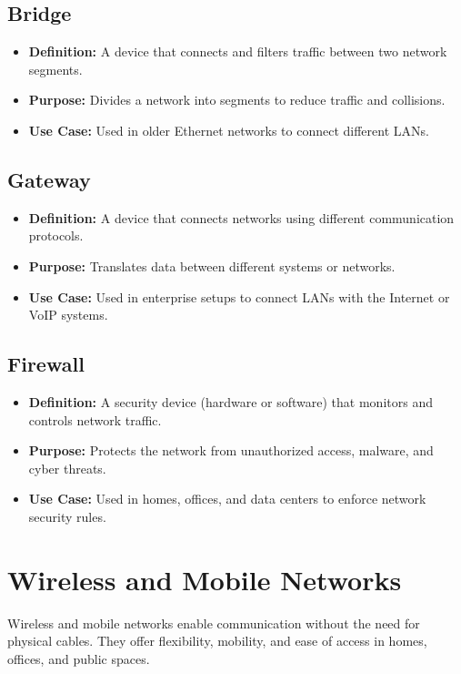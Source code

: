 \subsection{Bridge}
\begin{itemize}[leftmargin=1.5cm]
  \item \textbf{Definition:} A device that connects and filters traffic between two network segments.
  \item \textbf{Purpose:} Divides a network into segments to reduce traffic and collisions.
  \item \textbf{Use Case:} Used in older Ethernet networks to connect different LANs.
\end{itemize}

\subsection{Gateway}
\begin{itemize}[leftmargin=1.5cm]
  \item \textbf{Definition:} A device that connects networks using different communication protocols.
  \item \textbf{Purpose:} Translates data between different systems or networks.
  \item \textbf{Use Case:} Used in enterprise setups to connect LANs with the Internet or VoIP systems.
\end{itemize}

\subsection{Firewall}
\begin{itemize}[leftmargin=1.5cm]
  \item \textbf{Definition:} A security device (hardware or software) that monitors and controls network traffic.
  \item \textbf{Purpose:} Protects the network from unauthorized access, malware, and cyber threats.
  \item \textbf{Use Case:} Used in homes, offices, and data centers to enforce network security rules.
\end{itemize}

\section{Wireless and Mobile Networks}

Wireless and mobile networks enable communication without the need for physical cables. They offer flexibility, mobility, and ease of access in homes, offices, and public spaces.

